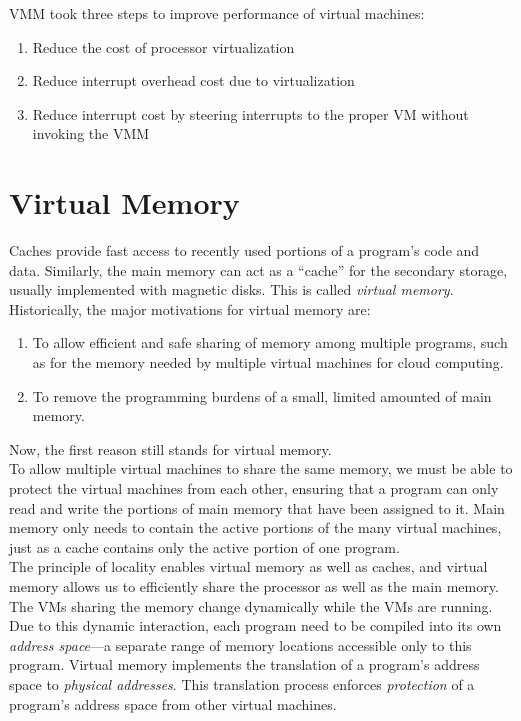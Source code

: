 \documentclass[12pt]{article}
\theoremstyle{definition}
\begin{document}
  VMM took three steps to improve performance of virtual machines:
  \begin{enumerate}
    \item Reduce the cost of processor virtualization
    \item Reduce interrupt overhead cost due to virtualization
    \item Reduce interrupt cost by steering interrupts to the proper VM without invoking the VMM
  \end{enumerate}

  \section{Virtual Memory}
  Caches provide fast access to recently used portions of a program's code and data.
  Similarly, the main memory can act as a ``cache'' for the secondary storage, usually implemented with magnetic disks.
  This is called \emph{virtual memory}. \\

  Historically, the major motivations for virtual memory are:
  \begin{enumerate}
    \item To allow efficient and safe sharing of memory among multiple programs, such as for the memory needed by multiple virtual machines for cloud computing.
    \item To remove the programming burdens of a small, limited amounted of main memory.
  \end{enumerate}
  Now, the first reason still stands for virtual memory. \\

  To allow multiple virtual machines to share the same memory, we must be able to protect the virtual machines from each other, ensuring that a program can only read and write the portions of main memory that have been assigned to it.
  Main memory only needs to contain the active portions of the many virtual machines, just as a cache contains only the active portion of one program. \\
  The principle of locality enables virtual memory as well as caches, and virtual memory allows us to efficiently share the processor as well as the main memory. \\

  The VMs sharing the memory change dynamically while the VMs are running.
  Due to this dynamic interaction, each program need to be compiled into its own \emph{address space}---a separate range of memory locations accessible only to this program.
  Virtual memory implements the translation of a program's address space to \emph{physical addresses}.
  This translation process enforces \emph{protection} of a program's address space from other virtual machines. \\
\end{document}
